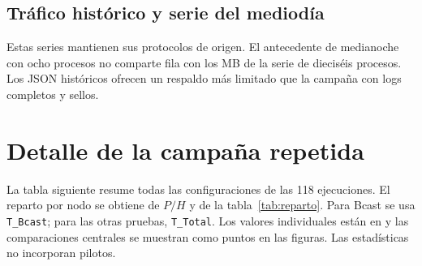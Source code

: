\subsection{Tráfico histórico y serie del mediodía}
Estas series mantienen sus protocolos de origen. El antecedente de medianoche con ocho procesos no comparte fila con los MB de la serie de dieciséis procesos. Los JSON históricos ofrecen un respaldo más limitado que la campaña con logs completos y sellos.
\begin{table}[H]\caption{Serie histórica con contadores: cuatro nodos y 16 procesos en las pruebas distribuidas.}\end{table}
\begin{table}[H]\caption{Serie histórica del mediodía: comparación de redes y descomposiciones. Las repeticiones indicadas pertenecen a esta serie.}\end{table}

\section{Detalle de la campaña repetida}

La tabla siguiente resume todas las configuraciones de las 118 ejecuciones. El reparto por nodo se obtiene de $P/H$ y de la tabla~\ref{tab:reparto}. Para Bcast se usa \texttt{T\_Bcast}; para las otras pruebas, \texttt{T\_Total}. Los valores individuales están en  y las comparaciones centrales se muestran como puntos en las figuras. Las estadísticas no incorporan pilotos.

\begin{landscape}\footnotesize\renewcommand{\arraystretch}{1.0}

\end{landscape}

\begin{table}[H]\caption{Razones entre ejecuciones del mismo bloque aleatorizado. A/B coincide con la tabla~\ref{tab:efectos}; no se exige que las corridas de un bloque sean consecutivas.}\label{tab:bloques}

\end{table}

